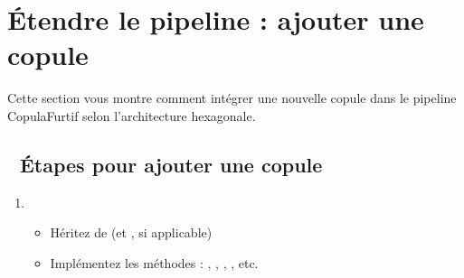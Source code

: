 \documentclass[letterpaper,18pt,english]{sphinxhowto}
\begin{document}
\section{Étendre le pipeline : ajouter une copule}
\label{\detokenize{pages/extending:etendre-le-pipeline-ajouter-une-copule}}\label{\detokenize{pages/extending:extending}}\label{\detokenize{pages/extending::doc}}
\sphinxAtStartPar
Cette section vous montre comment intégrer une nouvelle copule dans le pipeline CopulaFurtif selon l’architecture hexagonale.


\subsection{🧱 Étapes pour ajouter une copule}
\label{\detokenize{pages/extending:etapes-pour-ajouter-une-copule}}\begin{enumerate}
%
\item {} 
\sphinxAtStartPar
{}
\begin{itemize}
\item {} 
\sphinxAtStartPar
Héritez de  (et ,  si applicable)

\item {} 
\sphinxAtStartPar
Implémentez les méthodes : , , , , etc.

\end{itemize}

\end{enumerate}
\end{document}
